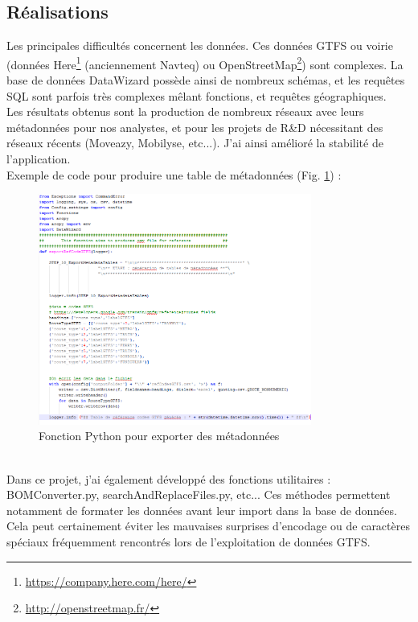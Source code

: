 \begin{itemize}
\subsection{Réalisations}

Les principales difficultés concernent les données. Ces données GTFS ou voirie (données Here\footnote{\url{https://company.here.com/here/}} (anciennement Navteq) ou OpenStreetMap\footnote{\url{http://openstreetmap.fr/}}) sont complexes. La base de données \og DataWizard \fg possède ainsi de nombreux schémas, et les requêtes SQL sont parfois très complexes mêlant fonctions, et requêtes géographiques.\\

Les résultats obtenus sont la production de nombreux réseaux avec leurs métadonnées pour nos analystes, et pour les projets de R\&D nécessitant des réseaux récents (Moveazy, Mobilyse, etc...). J'ai ainsi amélioré la stabilité de l'application.\\

Exemple de code pour produire une table de métadonnées (Fig. \ref{CodeMetadata}) :
\\
\begin{figure}[h]
	\centering
		\includegraphics[width=0.8\textwidth]{images/DW_Fonction_Python.PNG}
	\caption{Fonction Python pour exporter des métadonnées}
	\label{CodeMetadata}
\end{figure}\\

Dans ce projet, j'ai également développé des fonctions utilitaires : BOMConverter.py, searchAndReplaceFiles.py, etc... Ces méthodes permettent notamment de formater les données avant leur import dans la base de données. Cela peut certainement éviter les mauvaises surprises d'encodage ou de caractères spéciaux fréquemment rencontrés lors de l'exploitation de données GTFS.\\




\end{itemize}
